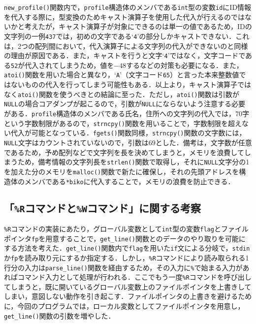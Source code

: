 \verb|new_profile()|関数内で，\verb|profile|構造体のメンバである\verb|int|型の変数\verb|id|にID情報を代入する際に，型変換のためキャスト演算子を使用した代入が行えるのではないかと考えたが，キャスト演算子が対象にできるのは単一の値であるため，IDの文字列の一例\verb|437|では，初めの文字である‘\verb|4|’の部分しかキャストできない．これは，2つの配列間において，代入演算子による文字列の代入ができないのと同様の理由が原因である．また，キャストを行うと文字‘\verb|4|’ではなく，文字コードである\verb|52|が代入されてしまうため，値を$-48$するなどの対策も必要になる．また，\verb|atoi()|関数を用いた場合と異なり，‘\verb|A|’（文字コード\verb|65|）と言った本来整数値ではないものの代入を行ってしまう可能性もある．以上より，キャスト演算子ではなく\verb|atoi()|関数を使うべきとの結論に至った．ただし，\verb|atoi()|関数は引数が\verb|NULL|の場合コアダンプが起こるので，引数が\verb|NULL|にならないよう注意する必要がある\cite{www:label7}．\verb|profile|構造体のメンバである氏名，住所への文字列の代入では，70字という字数制限があるので，\verb|strncpy()|関数を用いることで，字数制限を超えない代入が可能となっている．\verb|fgets()|関数同様，\verb|strncpy()|関数の文字数には，\verb|NULL|文字はカウントされていないので，引数は$69$とした．備考は，文字数が任意であるため，予め配列などで文字列を長を決めてしまうと，メモリを浪費してしまうため，備考情報の文字列長を\verb|strlen()|関数で取得し，それに\verb|NULL|文字分の1を加えた分のメモリを\verb|malloc()|関数で新たに確保し，それの先頭アドレスを構造体のメンバである\verb|*biko|に代入することで，メモリの浪費を防止できる．

\subsection{「\texttt{\%R}コマンドと\texttt{\%W}コマンド」に関する考察}

\verb|%R|コマンドの実装にあたり，グローバル変数として\verb|int|型の変数\verb|flag|とファイルポインタ\verb|fp|を用意することで，\verb|get_line()|関数とのデータのやり取りを可能にする方法を考えた．\verb|get_line()|関数内で\verb|flag|を用いた\verb|if|文による分岐で，\verb|stdin|か\verb|fp|を読み取り元にするか指定する．しかし，\verb|%R|コマンドにより読み取られる1行分の入力は\verb|parse_line()|関数を経由するため，その入力に\verb|%|で始まる入力があればコマンド入力として処理が行われる．ここでもう一度\verb|%R|コマンドを呼び出してしまうと，既に開いているグローバル変数上のファイルポインタを上書きしてしまい，意図しない動作を引き起こす．ファイルポインタの上書きを避けるために，今回のプログラムでは，ローカル変数としてファイルポインタを用意し，\verb|get_line()|関数の引数を増やした．

